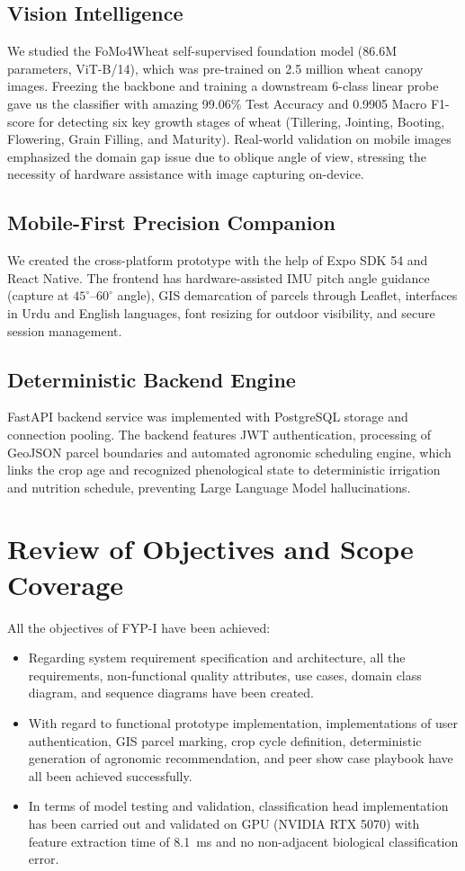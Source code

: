 \documentclass{FastFyp}
\begin{document}
\subsection{Vision Intelligence} 
We studied the FoMo4Wheat self-supervised foundation model (86.6M parameters, ViT-B/14), which was pre-trained on 2.5 million wheat canopy images. Freezing the backbone and training a downstream 6-class linear probe gave us the classifier with amazing 99.06\% Test Accuracy and 0.9905 Macro F1-score for detecting six key growth stages of wheat (Tillering, Jointing, Booting, Flowering, Grain Filling, and Maturity). Real-world validation on mobile images emphasized the domain gap issue due to oblique angle of view, stressing the necessity of hardware assistance with image capturing on-device.

\subsection{Mobile-First Precision Companion} 
We created the cross-platform prototype with the help of Expo SDK 54 and React Native. The frontend has hardware-assisted IMU pitch angle guidance (capture at $45^\circ$--$60^\circ$ angle), GIS demarcation of parcels through Leaflet, interfaces in Urdu and English languages, font resizing for outdoor visibility, and secure session management.

\subsection{Deterministic Backend Engine}
FastAPI backend service was implemented with PostgreSQL storage and connection pooling. The backend features JWT authentication, processing of GeoJSON parcel boundaries and automated agronomic scheduling engine, which links the crop age and recognized phenological state to deterministic irrigation and nutrition schedule, preventing Large Language Model hallucinations.


\section{Review of Objectives and Scope Coverage}

All the objectives of FYP-I have been achieved:
\begin{itemize}
    \item Regarding system requirement specification and architecture, all the requirements, non-functional quality attributes, use cases, domain class diagram, and sequence diagrams have been created.

    \item With regard to functional prototype implementation, implementations of user authentication, GIS parcel marking, crop cycle definition, deterministic generation of agronomic recommendation, and peer show case playbook have all been achieved successfully.

    \item In terms of model testing and validation, classification head implementation has been carried out and validated on GPU (NVIDIA RTX 5070) with feature extraction time of 8.1~ms and no non-adjacent biological classification error.
\end{itemize}
\end{document}
